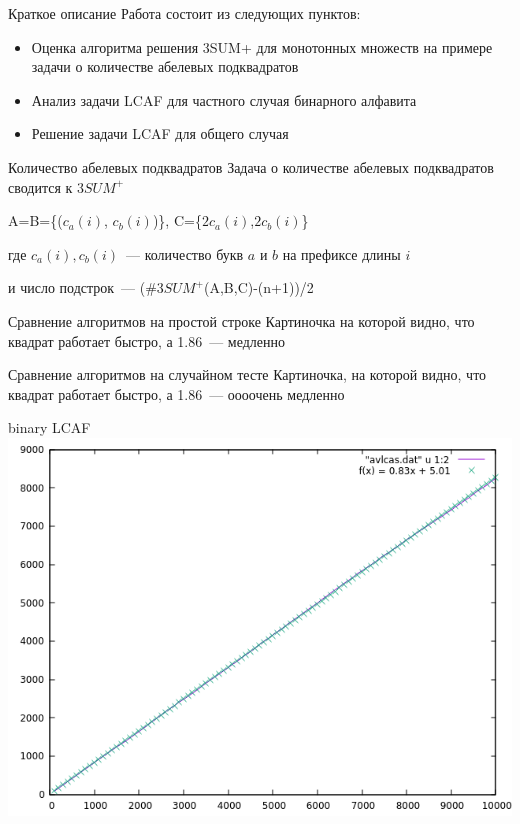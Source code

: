 \documentclass[hyperref=unicode,graphics=pdflatex,12pt]{beamer}
\begin{document}
\begin{frame}{Краткое описание}
\hspace{0.5cm}
Работа состоит из следующих пунктов:
\begin{itemize}
\item<2-> Оценка алгоритма решения 3SUM+ для монотонных множеств на примере задачи о количестве абелевых подквадратов
\item<3-> Анализ задачи LCAF для частного случая бинарного алфавита
\item<4-> Решение задачи LCAF для общего случая
\end{itemize}
\end{frame}

\begin{frame}{Количество абелевых подквадратов}
Задача о количестве абелевых подквадратов сводится к $3SUM^+$
\vspace{0.5cm}

 A=B=\{($c_a(i)$, $c_b(i)$)\}, C=\{$2c_a(i)$,$2c_b(i)$\}
\vspace{0.5cm}

где $c_a(i), c_b(i)$~--- количество букв $a$ и $b$ на префиксе длины $i$
\vspace{0.5cm}

 и число подстрок~--- (\#3$SUM^+$(A,B,C)-(n+1))/2

\end{frame}

\begin{frame}{Сравнение алгоритмов на простой строке}
Картиночка на которой видно, что квадрат работает быстро, а 1.86~--- медленно
\end{frame}

\begin{frame}{Сравнение алгоритмов на случайном тесте}
Картиночка, на которой видно, что квадрат работает быстро, а 1.86~--- оооочень медленно
\end{frame}

\begin{frame}{binary LCAF}
\includegraphics[scale=0.6]{pics/avlcas.png}
\end{frame}
\end{document}
